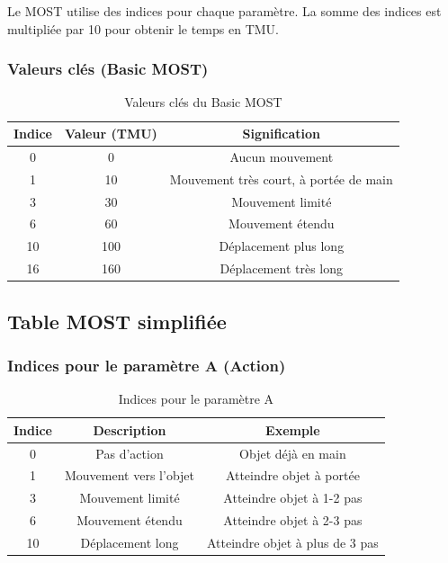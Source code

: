 \documentclass[a4paper,12pt]{article}
\begin{document}
Le MOST utilise des indices pour chaque paramètre. La somme des indices est multipliée par 10 pour obtenir le temps en TMU.

\subsubsection{Valeurs clés (Basic MOST)}

\begin{table}[ht]
\centering
\begin{tabular}{|c|c|c|}
\hline
\textbf{Indice} & \textbf{Valeur (TMU)} & \textbf{Signification} \\
\hline
0 & 0 & Aucun mouvement \\
1 & 10 & Mouvement très court, à portée de main \\
3 & 30 & Mouvement limité \\
6 & 60 & Mouvement étendu \\
10 & 100 & Déplacement plus long \\
16 & 160 & Déplacement très long \\
\hline
\end{tabular}
\caption{Valeurs clés du Basic MOST}
\end{table}

\begin{center}
\end{center}

\subsection{Table MOST simplifiée}

\subsubsection{Indices pour le paramètre A (Action)}

\begin{table}[ht]
\centering
\begin{tabular}{|c|c|c|}
\hline
\textbf{Indice} & \textbf{Description} & \textbf{Exemple} \\
\hline
0 & Pas d'action & Objet déjà en main \\
1 & Mouvement vers l'objet & Atteindre objet à portée \\
3 & Mouvement limité & Atteindre objet à 1-2 pas \\
6 & Mouvement étendu & Atteindre objet à 2-3 pas \\
10 & Déplacement long & Atteindre objet à plus de 3 pas \\
\hline
\end{tabular}
\caption{Indices pour le paramètre A}
\end{table}
\end{document}
